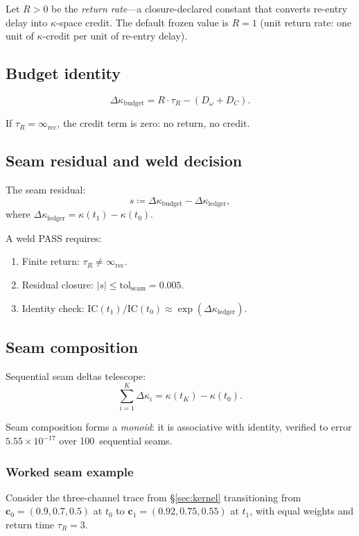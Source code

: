 \documentclass[
  aps,
  prd,
  twocolumn,
  superscriptaddress,
  nofootinbib,
  floatfix
]{revtex4-2}
\newcommand{\tR}{\tau_{\!R}}
\newcommand{\IR}{\infty_{\mathrm{rec}}}
\newcommand{\tolseam}{\mathrm{tol}_{\mathrm{seam}}}
\newcommand{\beq}{\begin{equation}}
\newcommand{\eeq}{\end{equation}}
\newcommand{\regime}[1]{\textrm{\upshape\scshape#1}}
\newcommand{\tvec}{\mathbf{c}}
\newcommand{\IC}{\mathrm{IC}}
\begin{document}
Let $R > 0$ be the \emph{return rate}---a closure-declared
constant that converts re-entry delay into
$\kappa$-space credit.  The default frozen value is
$R = 1$ (unit return rate: one unit of $\kappa$-credit
per unit of re-entry delay).

\subsection{Budget identity}

\beq
  \Delta\kappa_{\mathrm{budget}} = R \cdot \tR
  - (D_\omega + D_C).
\eeq

If $\tR = \IR$, the credit term is zero: no return, no credit.

\subsection{Seam residual and weld decision}

The seam residual:
\beq
  s \coloneqq \Delta\kappa_{\mathrm{budget}}
    - \Delta\kappa_{\mathrm{ledger}},
\eeq
where $\Delta\kappa_{\mathrm{ledger}} = \kappa(t_1) - \kappa(t_0)$.

A weld \regime{PASS} requires:
\begin{enumerate}[leftmargin=*,label=(\arabic*)]
\item Finite return: $\tR \neq \IR$.
\item Residual closure: $|s| \leq \tolseam = 0.005$.
\item Identity check: $\IC(t_1)/\IC(t_0)
  \approx \exp(\Delta\kappa_{\mathrm{ledger}})$.
\end{enumerate}

\subsection{Seam composition}

Sequential seam deltas telescope:
\beq
  \sum_{i=1}^{K} \Delta\kappa_i = \kappa(t_K) - \kappa(t_0).
\eeq

Seam composition forms a \emph{monoid}: it is associative with
identity, verified to error $5.55 \times 10^{-17}$ over
100~sequential seams.

\subsubsection{Worked seam example}

Consider the three-channel trace from \S\ref{sec:kernel}
transitioning from $\tvec_0 = (0.9, 0.7, 0.5)$ at $t_0$ to
$\tvec_1 = (0.92, 0.75, 0.55)$ at $t_1$, with equal weights and
return time $\tR = 3$.
\end{document}
